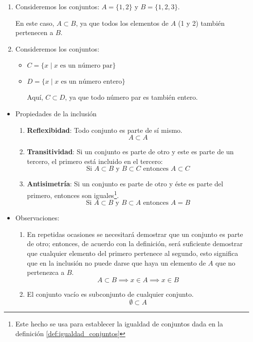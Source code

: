 \begin{fmd-example}[Inclusión]
	\begin{enumerate}
		\item Consideremos los conjuntos: \(A = \{1, 2\}\) y \(B = \{1, 2, 3\}\).
		
		En este caso, \(A \subset B\), ya que todos los elementos de \(A\) (1 y 2) también pertenecen a \(B\).
		
		\item Consideremos los conjuntos:
		
		\begin{itemize}
			\item \(C = \{x \mid x \mbox{ es un número par}\}\)
			\item \(D = \{x \mid x \mbox{ es un número entero}\}\)
			
			Aquí, \(C \subset D\), ya que todo número par es también entero.
		\end{itemize}
	\end{enumerate}
\end{fmd-example}


\begin{itemize}
	\item Propiedades de la inclusión
	\begin{enumerate}[label=\roman*)]
		\item \textbf{Reflexibidad}: Todo conjunto es parte de sí mismo.
		\[ A \subset A \]
		\item \textbf{Transitividad}: Si un conjunto es parte de otro y este es parte de un tercero, el primero está incluido en el tercero:
		\[\mbox{Si } A \subset B \mbox{ y } B \subset C \mbox{ entonces } A \subset C \]
		\item \textbf{Antisimetría}: Si un conjunto es parte de otro y éste es parte del primero, entonces son iguales\footnote{Este hecho se usa para establecer la igualdad de conjuntos dada en la definición \ref{def:igualdad_conjuntos}}.
		\[\mbox{Si } A \subset B \mbox{ y } B \subset A \mbox{ entonces } A = B \]
	\end{enumerate}
	
	\item Observaciones:
	
	\begin{enumerate}
		\item En repetidas ocasiones se necesitará demostrar que un conjunto es parte de otro; entonces, de acuerdo con la definición, será suficiente demostrar que cualquier elemento del primero pertenece al segundo, esto significa que en la inclusión no puede darse que haya un elemento de $A$ que no pertenezca a $B$.
		\[ A \subset B \implies x \in A \implies x \in B \]
		
		\item El conjunto vacío es subconjunto de cualquier conjunto.
		\[ \emptyset \subset A \]
	\end{enumerate}
\end{itemize}

